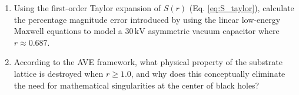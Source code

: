\begin{exercisebox}
\begin{enumerate}
    \item Using the first-order Taylor expansion of $S(r)$ (Eq. \ref{eq:S_taylor}), calculate the percentage magnitude error introduced by using the linear low-energy Maxwell equations to model a $30\,\text{kV}$ asymmetric vacuum capacitor where $r \approx 0.687$.
    \item According to the AVE framework, what physical property of the substrate lattice is destroyed when $r \ge 1.0$, and why does this conceptually eliminate the need for mathematical singularities at the center of black holes? 
\end{enumerate}
\end{exercisebox}
